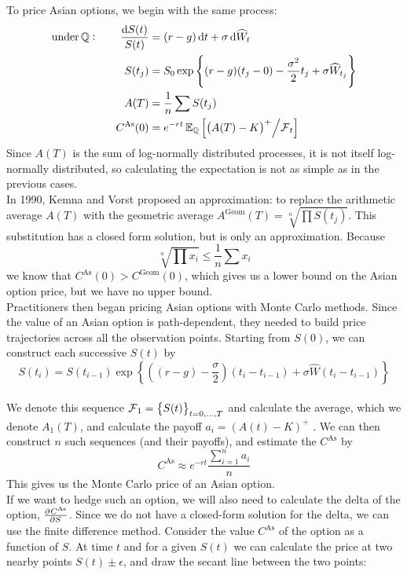\documentclass[11pt]{article}
\begin{document}
To price Asian options, we begin with the same process:
\begin{align*}
\text{under} \Qmeas: \qquad \frac{\dif S(t)}{S(t)} &= (r - g) \dif t + \sigma \dif \widehat{W}_t \\
S(t_j) &= S_0 \exp \left\{ (r-g)(t_j-0) - \frac{\sigma^2}{2}t_j + \sigma \widehat{W}_{t_j}\right\} \\
A(T) &= \frac{1}{n} \sum{S(t_j)} \\ 
C^{\text{As}}(0) &= e^{-rt} \Exp_{\Qmeas} \left[ \left( A(T)-K \right)^+ \middle/ \Filtr_t \right]\\
\end{align*}
Since $A(T)$ is the sum of log-normally distributed processes, it is not itself log-normally distributed, so calculating the expectation is not as simple as in the previous cases. \\

In 1990, Kemna and Vorst proposed an approximation: to replace the arithmetic average $A(T)$ with the geometric average $A^{\text{Geom}}(T) = \sqrt[n]{\prod{S(t_j)}}$. This substitution has a closed form solution, but is only an approximation. Because 
$$\sqrt[n]{\prod x_i} \leqslant \frac{1}{n}\sum x_i$$
we know that $C^{\text{As}}(0) > C^{\text{Geom}}(0)$, which gives us a lower bound on the Asian option price, but we have no upper bound. \\

Practitioners then began pricing Asian options with Monte Carlo methods. Since the value of an Asian option is path-dependent, they needed to build price trajectories across all the observation points. Starting from $S(0)$, we can construct each successive $S(t)$ by 
$$S(t_i) = S(t_{i-1}) \exp \left\{ \left( (r-g) - \frac{\sigma}{2} \right)(t_i - t_{i-1}) + \sigma \widehat{W}(t_i - t_{i-1}) \right\}$$ \\

We denote this sequence $\operatorname{\mathcal F}_1 = \left\{ S(t) \right\}_{t=0,\dots,T}$ and calculate the average, which we denote $A_1(T)$, and calculate the payoff $a_i = \left( A(t) - K\right)^+$ . We can then construct $n$ such sequences (and their payoffs), and estimate the $C^{\text{As}}$ by
$$C^{\text{As}} \approx e^{-rt} \frac{\sum_{i=1}^n a_i}{n}$$
This gives us the Monte Carlo price of an Asian option.\\

If we want to hedge such an option, we will also need to calculate the delta of the option, $\pd{C^{\text{As}}}{S}$. Since we do not have a closed-form solution for the delta, we can use the finite difference method. Consider the value $C^{\text{As}}$ of the option as a function of $S$. At time $t$ and for a given $S(t)$ we can calculate the price at two nearby points $S(t) \pm \epsilon$, and draw the secant line between the two points:\\
\end{document}
